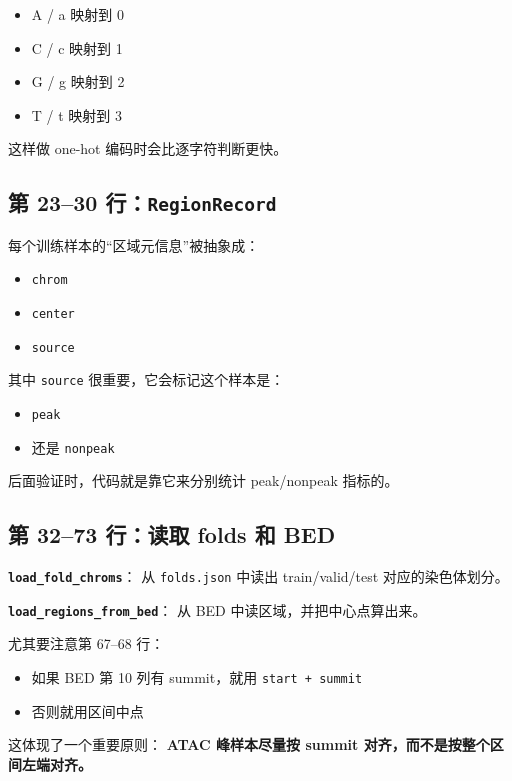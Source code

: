 \documentclass[11pt,a4paper]{ctexart}
\begin{document}
\begin{itemize}[leftmargin=2em]
\item A / a 映射到 0
\item C / c 映射到 1
\item G / g 映射到 2
\item T / t 映射到 3
\end{itemize}

这样做 one-hot 编码时会比逐字符判断更快。

\subsection{第 23--30 行：\texttt{RegionRecord}}

每个训练样本的“区域元信息”被抽象成：

\begin{itemize}[leftmargin=2em]
\item \texttt{chrom}
\item \texttt{center}
\item \texttt{source}
\end{itemize}

其中 \texttt{source} 很重要，它会标记这个样本是：

\begin{itemize}[leftmargin=2em]
\item \texttt{peak}
\item 还是 \texttt{nonpeak}
\end{itemize}

后面验证时，代码就是靠它来分别统计 peak/nonpeak 指标的。

\subsection{第 32--73 行：读取 folds 和 BED}

\textbf{\texttt{load\_fold\_chroms}}：
从 \texttt{folds.json} 中读出 train/valid/test 对应的染色体划分。

\textbf{\texttt{load\_regions\_from\_bed}}：
从 BED 中读区域，并把中心点算出来。

尤其要注意第 67--68 行：

\begin{itemize}[leftmargin=2em]
\item 如果 BED 第 10 列有 summit，就用 \texttt{start + summit}
\item 否则就用区间中点
\end{itemize}

这体现了一个重要原则：
\textbf{ATAC 峰样本尽量按 summit 对齐，而不是按整个区间左端对齐。}
\end{document}
